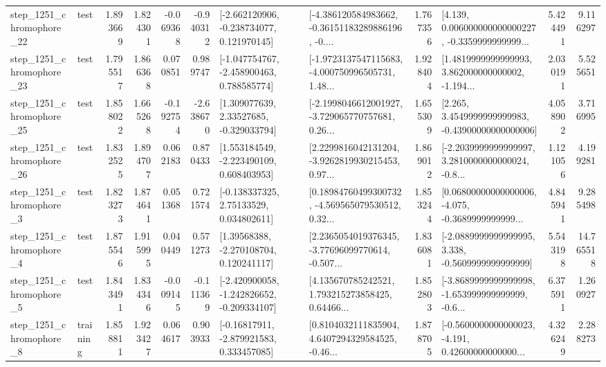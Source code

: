\begin{tabular}{llrrrrllrlrr}
 step\_1251\_chromophore\_22 &      test &      1.893669 &    1.824301 &     -0.069368 & -0.940312 &   [-2.662120906, -0.238734077, 0.121970145] &  [-4.386120584983662, -0.36151183289886196, -0.... &       1.767356 &  [4.139, 0.006000000000000227, -0.3359999999999... &            5.424491 &          9.116297 \\
 step\_1251\_chromophore\_23 &      test &      1.795517 &    1.866368 &      0.070851 &  0.989747 &   [-1.047754767, -2.458900463, 0.788585774] &  [-1.9723137547115683, -4.000750996505731, 1.48... &       1.928404 &  [1.4819999999999993, 3.862000000000002, -1.194... &            2.030191 &          5.525651 \\
 step\_1251\_chromophore\_25 &      test &      1.858022 &    1.665268 &     -0.192754 & -2.638670 &     [1.309077639, 2.33527685, -0.329033794] &  [-2.1998046612001927, -3.729065770757681, 0.26... &       1.655309 &  [2.265, 3.4549999999999983, -0.43900000000000006] &            4.058902 &          3.716995 \\
 step\_1251\_chromophore\_26 &      test &      1.832525 &    1.894707 &      0.062183 &  0.870433 &    [1.553184549, -2.223490109, 0.608403953] &  [2.2299816042131204, -3.9262819930215453, 0.97... &       1.869012 &  [-2.2039999999999997, 3.2810000000000024, -0.8... &            1.121056 &          4.199281 \\
  step\_1251\_chromophore\_3 &      test &      1.823273 &    1.874641 &      0.051368 &  0.721574 &     [-0.138337325, 2.75133529, 0.034802611] &  [0.18984760499300732, -4.569565079530512, 0.32... &       1.853244 &  [0.06800000000000006, -4.075, -0.3689999999999... &            4.845941 &          9.285498 \\
  step\_1251\_chromophore\_4 &      test &      1.875546 &    1.915995 &      0.040449 &  0.571273 &     [1.39568388, -2.270108704, 0.120241117] &  [2.2365054019376345, -3.77696099770614, -0.507... &       1.836081 &  [-2.0889999999999995, 3.338, -0.5609999999999999] &            5.543198 &         14.765518 \\
  step\_1251\_chromophore\_5 &      test &      1.843491 &    1.834346 &     -0.009145 & -0.111369 &  [-2.420900058, -1.242826652, -0.209334107] &  [4.135670785242521, 1.793215273858425, 0.64466... &       1.852803 &  [-3.8689999999999998, -1.653999999999999, -0.6... &            6.375911 &          1.260927 \\
  step\_1251\_chromophore\_8 &  training &      1.858811 &    1.923427 &      0.064617 &  0.903933 &    [-0.16817911, -2.879921583, 0.333457085] &  [0.8104032111835904, 4.6407294329584525, -0.46... &       1.878705 &  [-0.5600000000000023, -4.191, 0.42600000000000... &            4.326249 &          2.288273 \\

\end{tabular}
